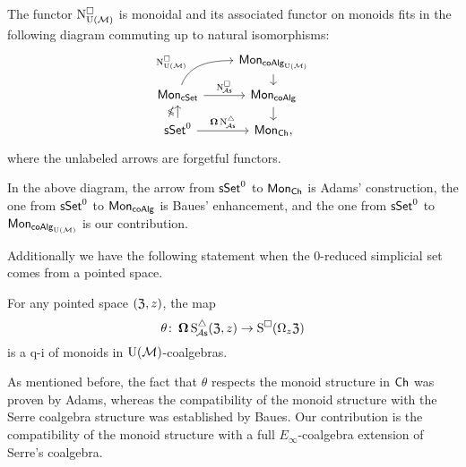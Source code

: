 \begin{theorem*}
	The functor $\operatorname{N^{\square}_{{\operatorname{U}(\mathcal{M})}}}$ is monoidal and its associated functor on monoids fits in the following diagram commuting up to natural isomorphisms:
	\[
	\begin{tikzcd} [row sep=small]
		& \Mon_{\coAlg_\UM} \arrow[d] \\
		\Mon_{\cSet} \arrow[ru, "\cchainsUM", out=70, in=180, near start] \arrow[r, "\cchainsA"]
		& \Mon_{\coAlg} \arrow[d] \\
		\sSet^0 \arrow[r, "\cobar \schainsA"] \arrow[u, "\ccobar"]
		& \Mon_{\Ch},
	\end{tikzcd}
	\]
	where the unlabeled arrows are forgetful functors.
\end{theorem*}

In the above diagram, the arrow from $\mathsf{sSet}^0$ to $\mathsf{Mon}_{\mathsf{Ch}}$ is Adams' construction, the one from $\mathsf{sSet}^0$ to $\mathsf{Mon}_{\mathsf{coAlg}}$ is Baues' enhancement, and the one from $\mathsf{sSet}^0$ to $\mathsf{Mon}_{\mathsf{coAlg}_{{\operatorname{U}(\mathcal{M})}}}$ is our contribution.

Additionally we have the following statement when the 0-reduced simplicial set comes from a pointed space.

\begin{theorem*}
	For any pointed space $(\mathfrak{Z}, z)$, the map
	\[
	\theta \colon \operatorname{\mathbf{\Omega}} \operatorname{S^{\triangle}_{\!{\mathcal{A}\mathsf{s}}}}(\mathfrak{Z}, z) \to \operatorname{S^{\square}}(\Omega_z \mathfrak{Z})
	\]
	is a q-i of monoids in ${\operatorname{U}(\mathcal{M})}$-coalgebras.
\end{theorem*}

As mentioned before, the fact that $\theta$ respects the monoid structure in $\mathsf{Ch}$ was proven by Adams, whereas the compatibility of the monoid structure with the Serre coalgebra structure was established by Baues.
Our contribution is the compatibility of the monoid structure with a full $E_\infty$-coalgebra extension of Serre's coalgebra.